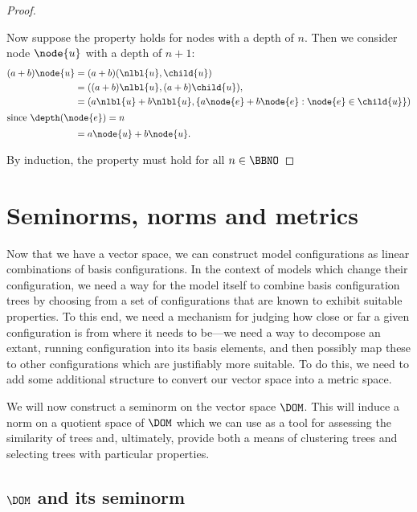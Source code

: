 \begin{proposition}
\begin{proof}
\begin{description}
      Now suppose the property holds for nodes with a depth of $n$.
      Then we consider node $\node{u}$ with a depth of $n+1$:
      \begin{align*}
        (a + b)\node{u} &= (a + b) (\nlbl{u}, \child{u}) \\
        &= ((a + b)\nlbl{u}, (a + b)\child{u}), \\
        &= (a\nlbl{u} + b\nlbl{u}, \{a \node{e} + b \node{e}:\node{e}\in\child{u}\}) \\
        \intertext{since $\depth(\node{e}) = n$}
        &= a \node{u} + b \node{u}.
      \end{align*}

    \end{description}
    By induction, the property must hold for all $n \in\BBNO$
  \end{proof}
\end{proposition}

\section{Seminorms, norms and metrics} %

Now that we have a vector space, we can construct model configurations
as linear combinations of basis configurations. In the context of
models which change their configuration, we need a way for the model
itself to combine basis configuration trees by choosing from a set of
configurations that are known to exhibit suitable properties.  To this
end, we need a mechanism for judging how close or far a given
configuration is from where it needs to be---we need a way to
decompose an extant, running configuration into its basis elements,
and then possibly map these to other configurations which are
justifiably more suitable.  To do this, we need to add some additional
structure to convert our vector space into a metric space.

We will now construct a seminorm on the vector space
$\DOM$. This will induce a norm on a quotient space of $\DOM$ which we
can use as a tool for assessing the similarity of trees and,
ultimately, provide both a means of clustering trees and selecting
trees with particular properties.

\subsection{$\DOM$ and its seminorm}

